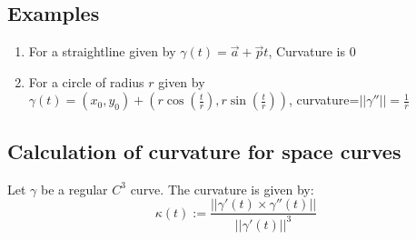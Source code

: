 \documentclass[oneside]{book}\twocolumn
\begin{document}
\subsection{Examples}
\begin{enumerate}
    \item For a straightline given by $\gamma(t)=\vec{a}+\vec{p}t$, Curvature is 0
    \item For a circle of radius $r$ given by $\gamma(t)=(x_0,y_0)+\left(r\cos\left(\frac{t}{r}\right),r\sin\left(\frac{t}{r}\right)\right)$, curvature=$||\gamma''||=\frac{1}{r}$
\end{enumerate}
\subsection{Calculation of curvature for space curves}
Let $\gamma$ be a regular $C^3$ curve. The curvature is given by:
$$\kappa(t):=\frac{||\gamma'(t)\times\gamma''(t)||}{||\gamma'(t)||^3}$$
\end{document}
